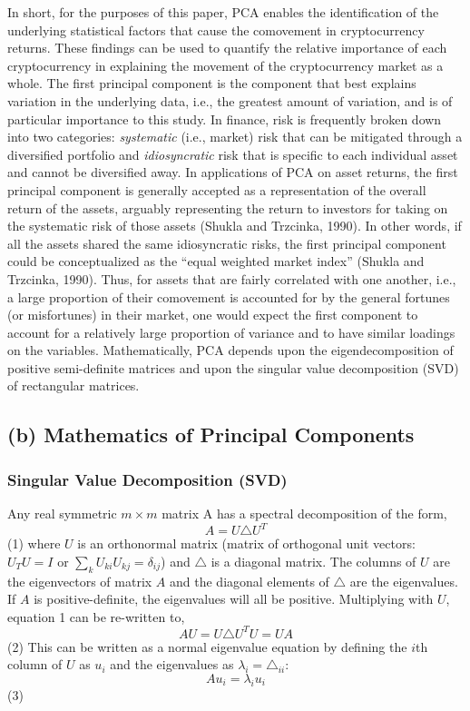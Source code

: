 \documentclass[12pt,twoside]{article}
\begin{document}
In short, for the purposes of this paper, PCA enables the identification of the underlying statistical factors that cause the comovement in cryptocurrency returns. These findings can be used to quantify the relative importance of each cryptocurrency in explaining the movement of the cryptocurrency market as a whole.
\bigbreak
The first principal component is the component that best explains variation in the underlying data, i.e., the greatest amount of variation, and is of particular importance to this study. In finance, risk is frequently broken down into two categories: \textit{systematic} (i.e., market) risk that can be mitigated through a diversified portfolio and \textit{idiosyncratic} risk that is specific to each individual asset and cannot be diversified away. In applications of PCA on asset returns, the first principal component is generally accepted as a representation of the overall return of the assets, arguably representing the return to investors for taking on the systematic risk of those assets (Shukla and Trzcinka, 1990). In other words, if all the assets shared the same idiosyncratic risks, the first principal component could be conceptualized as the “equal weighted market index” (Shukla and Trzcinka, 1990). Thus, for assets that are fairly correlated with one another, i.e., a large proportion of their comovement is accounted for by the general fortunes (or misfortunes) in their market, one would expect the first component to account for a relatively large proportion of variance and to have similar loadings on the variables.
\bigbreak
Mathematically, PCA depends upon the eigendecomposition of positive semi-definite matrices and upon the singular value decomposition (SVD) of rectangular matrices.

\subsection*{(b) Mathematics of Principal Components}

\subsubsection*{Singular Value Decomposition (SVD)}
\bigbreak
Any real symmetric $m \times m$ matrix A has a spectral decomposition of the form,
$$A = U\triangle U^{T}$$  \hfill(1)
\bigbreak
where $U$ is an orthonormal matrix (matrix of orthogonal unit vectors: $U_{T}U = I$ or $\sum_{k}U_{ki}U_{kj} = \delta_{ij}$) and $\triangle$ is a diagonal matrix. The columns of $U$ are the eigenvectors of matrix $A$ and the diagonal elements of $\triangle$ are the eigenvalues. If $A$ is positive-definite, the eigenvalues will all be positive. Multiplying with $U$, equation 1 can be re-written to,
$$AU = U\triangle U^{T}U = UA$$  \hfill(2)
\bigbreak
This can be written as a normal eigenvalue equation by defining the $i$th column of $U$ as
$u_{i}$ and the eigenvalues as $\lambda_{i} = \triangle_{ii}$:
$$Au_{i} = \lambda_{i}u_{i}$$  \hfill(3)
\end{document}
